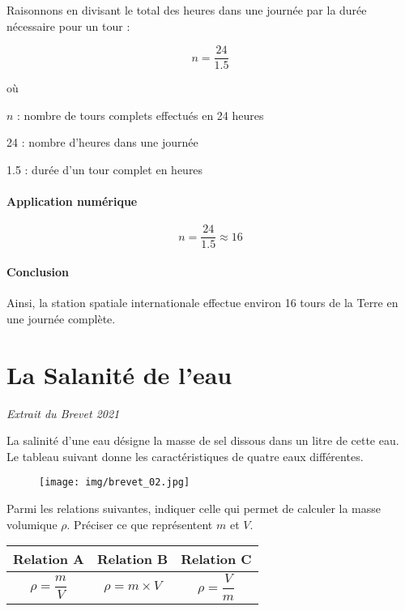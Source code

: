 \documentclass[answers]{exam}
\begin{document}
\begin{questions}
\begin{solution}
Raisonnons en divisant le total des heures dans une journée par la durée nécessaire pour un tour :

\[
n = \frac{24}{1.5}
\]

où
\begin{addmargin}[4em]{1em}
  \begin{compactitem}
      \item [$n$]: nombre de tours complets effectués en 24 heures
      \item [24]: nombre d'heures dans une journée
      \item [1.5]: durée d'un tour complet en heures
  \end{compactitem}
\end{addmargin}

\paragraph{Application numérique} 

\[
n = \frac{24}{1.5} \approx 16
\]

\paragraph{Conclusion} 
Ainsi, la station spatiale internationale effectue environ 16 tours de la Terre en une journée complète.
\end{solution}

\section*{La Salanité de l'eau}

\textit{Extrait du Brevet 2021}
\vspace{1em}

La salinité d’une eau désigne la masse de sel dissous dans un litre de cette eau.
Le tableau suivant donne les caractéristiques de quatre eaux différentes.

\begin{figure}[H]
  \centering
  \texttt{[image: img/brevet\_02.jpg]}
\end{figure}

  \question[3] Parmi les relations suivantes, indiquer celle qui permet de calculer la masse volumique $\rho$. Préciser ce que représentent $m$ et $V$.

  \begin{center}
    \renewcommand{\arraystretch}{2} %
    \setlength{\tabcolsep}{20pt}   %
    \begin{tabular}{|c|c|c|}
    \hline
    Relation A & Relation B & Relation C \\
    \hline
    $\rho = \dfrac{m}{V}$ & $\rho = m \times V$ & $\rho = \dfrac{V}{m}$ \\
    \hline
    \end{tabular}
    \end{center}
  

\end{questions}
\end{document}
